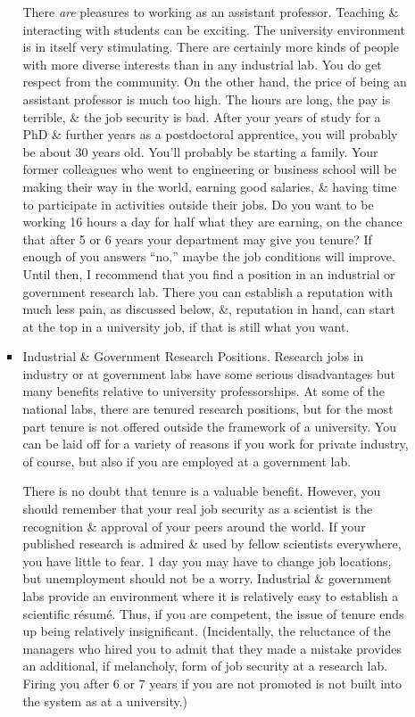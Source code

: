 \documentclass{article}
\begin{document}
\begin{enumerate}
\begin{itemize}
\begin{itemize}
			There \textit{are} pleasures to working as an assistant professor. Teaching \& interacting with students can be exciting. The university environment is in itself very stimulating. There are certainly more kinds of people with more diverse interests than in any industrial lab. You do get respect from the community. On the other hand, the price of being an assistant professor is much too high. The hours are long, the pay is terrible, \& the job security is bad. After your years of study for a PhD \& further years as a postdoctoral apprentice, you will probably be about 30 years old. You'll probably be starting a family. Your former colleagues who went to engineering or business school will be making their way in the world, earning good salaries, \& having time to participate in activities outside their jobs. Do you want to be working 16 hours a day for half what they are earning, on the chance that after 5 or 6 years your department may give you tenure? If enough of you answers ``no,'' maybe the job conditions will improve. Until then, I recommend that you find a position in an industrial or government research lab. There you can establish a reputation with much less pain, as discussed below, \&, reputation in hand, can start at the top in a university job, if that is still what you want.
			\item {\sf Industrial \& Government Research Positions.} Research jobs in industry or at government labs have some serious disadvantages but many benefits relative to university professorships. At some of the national labs, there are tenured research positions, but for the most part tenure is not offered outside the framework of a university. You can be laid off for a variety of reasons if you work for private industry, of course, but also if you are employed at a government lab.
			
			There is no doubt that tenure is a valuable benefit. However, you should remember that your real job security as a scientist is the recognition \& approval of your peers around the world. If your published research is admired \& used by fellow scientists everywhere, you have little to fear. 1 day you may have to change job locations, but unemployment should not be a worry. Industrial \& government labs provide an environment where it is relatively easy to establish a scientific r\'esum\'e. Thus, if you are competent, the issue of tenure ends up being relatively insignificant. (Incidentally, the reluctance of the managers who hired you to admit that they made a mistake provides an additional, if melancholy, form of job security at a research lab. Firing you after 6 or 7 years if you are not promoted is not built into the system as at a university.)
			

\end{itemize}
\end{itemize}
\end{enumerate}
\end{document}
